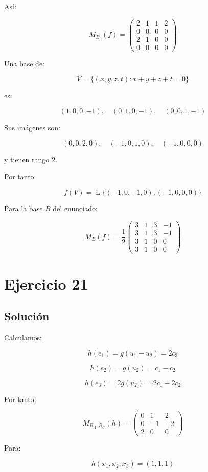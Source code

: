 \documentclass[11pt,a4paper]{article}
\newcommand{\Span}{\operatorname{L}}
\begin{document}
	Así:

	\[
	\boxed{
	M_{B_c}(f)
	=
	\begin{pmatrix}
	2&1&1&2\\
	0&0&0&0\\
	2&1&0&0\\
	0&0&0&0
	\end{pmatrix}
	}
	\]

	Una base de:

	\[
	V=\{(x,y,z,t):x+y+z+t=0\}
	\]

	es:

	\[
	(1,0,0,-1),
	\quad
	(0,1,0,-1),
	\quad
	(0,0,1,-1)
	\]

	Sus imágenes son:

	\[
	(0,0,2,0),
	\quad
	(-1,0,1,0),
	\quad
	(-1,0,0,0)
	\]

	y tienen rango $2$.

	Por tanto:

	\[
	\boxed{
	f(V)
	=
	\Span\{(-1,0,-1,0),(-1,0,0,0)\}
	}
	\]

	Para la base $B$ del enunciado:

	\[
	\boxed{
	M_B(f)
	=
	\frac12
	\begin{pmatrix}
	3&1&3&-1\\
	3&1&3&-1\\
	3&1&0&0\\
	3&1&0&0
	\end{pmatrix}
	}
	\]

\section{Ejercicio 21}
	\subsection{Solución}

	Calculamos:

	\[
	h(e_1)
	=
	g(u_1-u_2)
	=
	2c_3
	\]

	\[
	h(e_2)
	=
	g(u_2)
	=
	c_1-c_2
	\]

	\[
	h(e_3)
	=
	2g(u_2)
	=
	2c_1-2c_2
	\]

	Por tanto:

	\[
	\boxed{
	M_{B_A,B_C}(h)
	=
	\begin{pmatrix}
	0&1&2\\
	0&-1&-2\\
	2&0&0
	\end{pmatrix}
	}
	\]

	Para:

	\[
	h(x_1,x_2,x_3)=(1,1,1)
	\]
\end{document}
